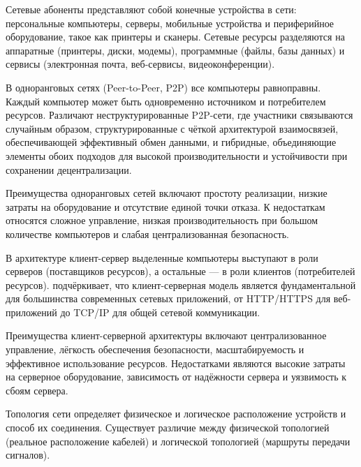 \documentclass{SibFU-docs}
\begin{document}

Сетевые абоненты представляют собой конечные устройства в сети: персональные компьютеры, серверы, мобильные устройства и периферийное оборудование, такое как принтеры и сканеры. Сетевые ресурсы разделяются на аппаратные (принтеры, диски, модемы), программные (файлы, базы данных) и сервисы (электронная почта, веб-сервисы, видеоконференции).

\vspace*{-1.5em}

В одноранговых сетях (Peer-to-Peer, P2P) все компьютеры равноправны. Каждый компьютер может быть одновременно источником и потребителем ресурсов. Различают неструктурированные P2P-сети, где участники связываются случайным образом, структурированные с чёткой архитектурой взаимосвязей, обеспечивающей эффективный обмен данными, и гибридные, объединяющие элементы обоих подходов для высокой производительности и устойчивости при сохранении децентрализации.

Преимущества одноранговых сетей включают простоту реализации, низкие затраты на оборудование и отсутствие единой точки отказа. К недостаткам относятся сложное управление, низкая производительность при большом количестве компьютеров и слабая централизованная безопасность.


В архитектуре клиент-сервер выделенные компьютеры выступают в роли серверов (поставщиков ресурсов), а остальные --- в роли клиентов (потребителей ресурсов). \cite{kurose2021computer} подчёркивает, что клиент-серверная модель является фундаментальной для большинства современных сетевых приложений, от HTTP/HTTPS для веб-приложений до TCP/IP для общей сетевой коммуникации.

Преимущества клиент-серверной архитектуры включают централизованное управление, лёгкость обеспечения безопасности, масштабируемость и эффективное использование ресурсов. Недостатками являются высокие затраты на серверное оборудование, зависимость от надёжности сервера и уязвимость к сбоям сервера.


Топология сети определяет физическое и логическое расположение устройств и способ их соединения. Существует различие между физической топологией (реальное расположение кабелей) и логической топологией (маршруты передачи сигналов).
\end{document}
